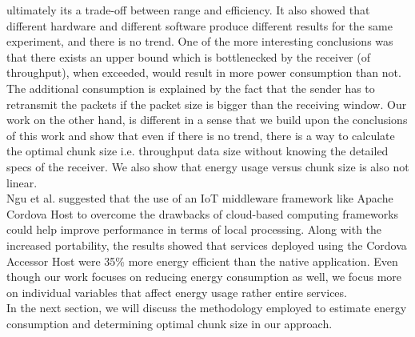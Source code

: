 ultimately its a trade-off between range and efficiency. It also showed that different hardware and different software produce 
different results for the same experiment, and there is no trend. One of the more interesting conclusions was that there 
exists an upper bound which is bottlenecked by the receiver (of throughput), when exceeded, would result in more power consumption than 
not. The additional consumption is explained by the fact that the sender has to retransmit the packets if the packet size is 
bigger than the receiving window. Our work on the other hand, is different in a sense that we build upon the conclusions of this work 
and show that even if there is no trend, there is a way to calculate the optimal chunk size i.e. throughput data size without 
knowing the detailed specs of the receiver. We also show that energy usage versus chunk size is also not linear. \\
Ngu et al. \cite{9446337} suggested that the use of an IoT middleware framework like Apache Cordova Host \cite{cordovahost} to overcome the drawbacks of cloud-based 
computing frameworks could help improve performance in terms of local processing. Along with the increased portability, the 
results showed that services deployed using the Cordova Accessor Host were 35\% more energy efficient than the native application. 
Even though our work focuses on reducing energy consumption as well, we focus more on individual variables that affect energy usage 
rather entire services. \\
In the next section, we will discuss the methodology employed to estimate energy consumption and determining optimal chunk size in 
our approach. 